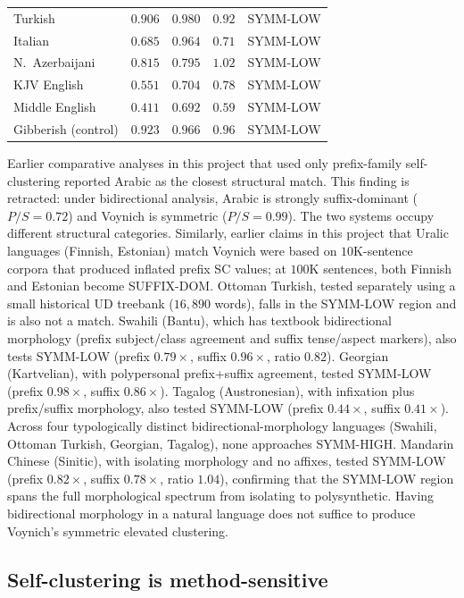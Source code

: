 \documentclass[11pt]{article}
\begin{document}
\begin{table}[ht]
\begin{tabular}{lrrrl}
    Turkish             & $0.906$ & $0.980$ & $0.92$ & SYMM-LOW \\
    Italian             & $0.685$ & $0.964$ & $0.71$ & SYMM-LOW \\
    N.~Azerbaijani      & $0.815$ & $0.795$ & $1.02$ & SYMM-LOW \\
    KJV English         & $0.551$ & $0.704$ & $0.78$ & SYMM-LOW \\
    Middle English      & $0.411$ & $0.692$ & $0.59$ & SYMM-LOW \\
    Gibberish (control) & $0.923$ & $0.966$ & $0.96$ & SYMM-LOW \\
    \bottomrule
  \end{tabular}
\end{table}

Earlier comparative analyses in this project that used only
prefix-family self-clustering reported Arabic as the closest structural
match. This finding is retracted: under bidirectional analysis, Arabic
is strongly suffix-dominant ($P/S = 0.72$) and Voynich is symmetric
($P/S = 0.99$). The two systems occupy different structural categories.
Similarly, earlier claims in this project that Uralic languages (Finnish,
Estonian) match Voynich were based on $10$K-sentence corpora that
produced inflated prefix SC values; at $100$K sentences, both Finnish
and Estonian become SUFFIX-DOM. Ottoman Turkish, tested separately
using a small historical UD treebank ($16{,}890$ words), falls in the
SYMM-LOW region and is also not a match. Swahili (Bantu), which has
textbook bidirectional morphology (prefix subject/class agreement and
suffix tense/aspect markers), also tests SYMM-LOW (prefix $0.79\times$,
suffix $0.96\times$, ratio $0.82$). Georgian (Kartvelian), with polypersonal
prefix+suffix agreement, tested SYMM-LOW (prefix $0.98\times$, suffix
$0.86\times$). Tagalog (Austronesian), with infixation plus
prefix/suffix morphology, also tested SYMM-LOW (prefix $0.44\times$,
suffix $0.41\times$). Across four typologically distinct
bidirectional-morphology languages (Swahili, Ottoman Turkish, Georgian,
Tagalog), none approaches SYMM-HIGH. Mandarin Chinese (Sinitic), with isolating
morphology and no affixes, tested SYMM-LOW (prefix $0.82\times$, suffix
$0.78\times$, ratio $1.04$), confirming that the SYMM-LOW region spans
the full morphological spectrum from isolating to polysynthetic.
Having bidirectional morphology in a natural language does not suffice to produce Voynich's symmetric
elevated clustering.

\subsection{Self-clustering is method-sensitive}
\end{document}
